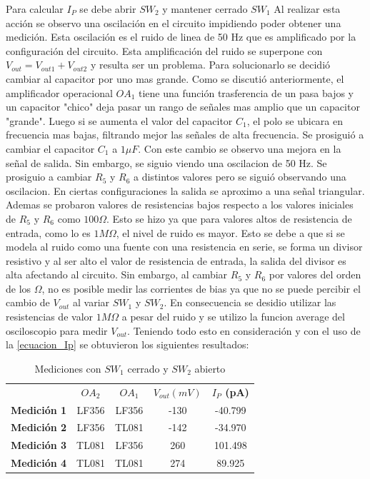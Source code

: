 Para calcular $I_{P}$ se debe abrir $SW_2$ y mantener cerrado $SW_1$  Al realizar esta acción se observo una oscilación en el circuito impidiendo poder obtener una medición. Esta oscilación es el ruido de linea de 50 Hz que es amplificado por la configuración del circuito.
Esta amplificación del ruido se superpone con $V_{out} = V_{out1} + V_{out2}$ y resulta ser un problema. Para solucionarlo se decidió cambiar al capacitor por uno mas grande. 
Como se discutió anteriormente, el amplificador operacional $OA_1$ tiene una función trasferencia de un pasa bajos y un capacitor "chico" deja pasar un rango de señales mas amplio que un capacitor "grande". Luego si se aumenta el valor del capacitor $C_1$, el polo se 
ubicara en frecuencia mas bajas, filtrando mejor las señales de alta frecuencia. Se prosiguió a cambiar el capacitor $C_1$ a $1\mu F$. Con este cambio se observo una mejora en la señal de salida. Sin embargo, se siguio viendo una oscilacion de 50 Hz. Se prosiguio a cambiar $R_5$ y $R_6$ a distintos
valores pero se siguió observando una oscilacion. En ciertas configuraciones la salida se aproximo a una señal triangular. Ademas se probaron valores de resistencias bajos respecto a los valores iniciales de $R_5$ y $R_6$ como $100\Omega$. Esto se hizo ya que para valores altos de resistencia de
entrada, como lo es $1M\Omega$, el nivel de ruido es mayor. Esto se debe a que si se modela al ruido como una fuente con una resistencia en serie, se forma un divisor resistivo y al ser alto el valor de resistencia de entrada, la salida del divisor es alta afectando al circuito. Sin embargo, al cambiar 
$R_5$ y $R_6$ por valores del orden de los $\Omega$, no es posible medir las corrientes de bias ya que no se puede percibir el cambio de $V_{out}$ al variar $SW_1$ y $SW_2$. En consecuencia se desidio utilizar las resistencias de valor $1M\Omega$ a pesar del ruido y se utilizo la funcion average del osciloscopio
para medir $V_{out}$.
Teniendo todo esto en consideración y con el uso de la \ref{ecuacion_Ip} se obtuvieron los siguientes resultados:


\begin{table}[h!]
    \centering
    \caption{Mediciones con $SW_1$ cerrado y $SW_2$ abierto}
    \label{table3}
    \begin{tabular}{@{}ccccc@{}}
    \textbf{}           & \textbf{$OA_2$} & \textbf{$OA_1$} & \textbf{$V_{out} (mV)$} & \textbf{$I_P$ (pA)} \\ 
    \textbf{Medición 1} & LF356          & LF356          & -130              & -40.799             \\
    \textbf{Medición 2} & LF356          & TL081          & -142              &  -34.970            \\
    \textbf{Medición 3} & TL081          & LF356          & 260              &  101.498            \\
    \textbf{Medición 4} & TL081          & TL081          & 274              & 89.925             \\ 
    \end{tabular}
\end{table}


